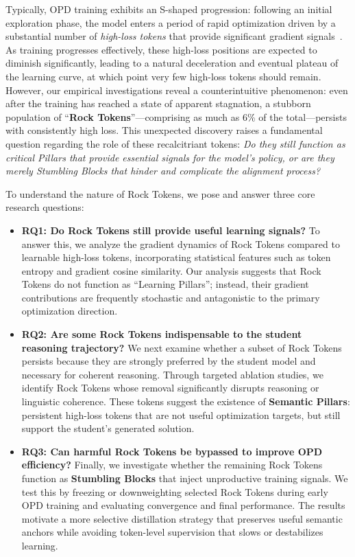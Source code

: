Typically, OPD training exhibits an S-shaped progression: following an initial exploration phase, the model enters a period of rapid optimization driven by a substantial number of \textit{high-loss tokens} that provide significant gradient signals~\cite{fu2026revisiting}. As training progresses effectively, these high-loss positions are expected to diminish significantly, leading to a natural deceleration and eventual plateau of the learning curve, at which point very few high-loss tokens should remain. However, our empirical investigations reveal a counterintuitive phenomenon: even after the training has reached a state of apparent stagnation, a stubborn population of ``\textbf{Rock Tokens}''—comprising as much as 6\% of the total—persists with consistently high loss. This unexpected discovery raises a fundamental question regarding the role of these recalcitriant tokens: \textit{Do they still function as critical Pillars that provide essential signals for the model's policy, or are they merely Stumbling Blocks that hinder and complicate the alignment process?}



To understand the nature of Rock Tokens, we pose and answer three core research questions:

\begin{itemize}
    \item \textbf{RQ1: Do Rock Tokens still provide useful learning signals?}
   To answer this, we analyze the gradient dynamics of Rock Tokens compared to learnable high-loss tokens, incorporating statistical features such as token entropy and gradient cosine similarity.  Our analysis suggests that Rock Tokens do not function as ``Learning Pillars''; instead, their gradient contributions are frequently stochastic and antagonistic to the primary optimization direction.

    \item \textbf{RQ2: Are some Rock Tokens indispensable to the student reasoning trajectory?}
    We next examine whether a subset of Rock Tokens persists because they are strongly preferred by the student model and necessary for coherent reasoning. Through targeted ablation studies, we identify Rock Tokens whose removal significantly disrupts reasoning or linguistic coherence. These tokens suggest the existence of \textbf{Semantic Pillars}: persistent high-loss tokens that are not useful optimization targets, but still support the student's generated solution.

    \item \textbf{RQ3: Can harmful Rock Tokens be bypassed to improve OPD efficiency?}
    Finally, we investigate whether the remaining Rock Tokens function as \textbf{Stumbling Blocks} that inject unproductive training signals. We test this by freezing or downweighting selected Rock Tokens during early OPD training and evaluating convergence and final performance. The results motivate a more selective distillation strategy that preserves useful semantic anchors while avoiding token-level supervision that slows or destabilizes learning.
\end{itemize}


